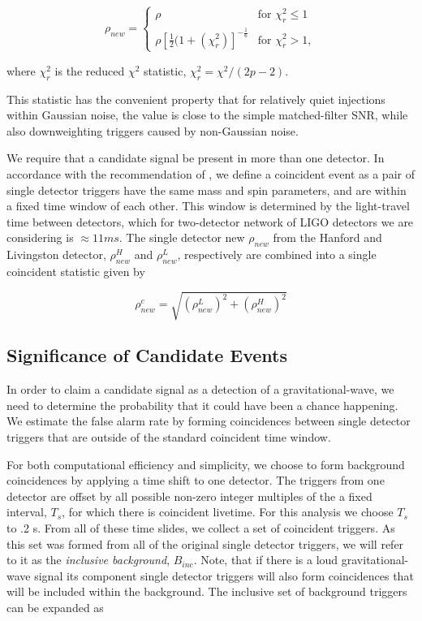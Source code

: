 \begin{equation}
\rho_{new} =
  \begin{cases}
    \rho &\textrm{for } \chi^2_r \leq 1\\
    \rho[\frac{1}{2}(1+(\chi^2_r)]^{-\frac{1}{6}} &\textrm{for } \chi^2_r > 1,
  \end{cases}
\label{eq:newSNR}
\end{equation}

where $\chi^2_r$ is the reduced $\chi^2$ statistic, $\chi^2_r=\chi^2 / (2p - 2)$.

This statistic has the convenient property that for relatively quiet injections within Gaussian noise, the value is close to the simple matched-filter SNR, while also downweighting triggers caused by non-Gaussian noise.

We require that a candidate signal be present in more than one detector. In accordance with the recommendation of \cite{samantha}, we define a coincident event as a  pair of single detector triggers have the same mass and spin parameters, and are within a fixed time window of each other. This window is determined by the light-travel time between detectors, which for two-detector network of LIGO detectors we are considering is $\approx 11 ms$. The single detector new $\rho_{new}$ from the Hanford and Livingston detector, $\rho^H_{new}$ and $\rho^L_{new}$, respectively are combined into a single coincident statistic given by

\begin{equation}
\rho^c_{new} = \sqrt{(\rho^L_{new})^2 + (\rho^H_{new})^2}
\end{equation}

\subsection{Significance of Candidate Events}

In order to claim a candidate signal as a detection of a gravitational-wave, we need to determine the probability that it could have been a chance happening. We estimate the false alarm rate by forming coincidences between single detector triggers that are outside of the standard coincident time window. 

For both computational efficiency and simplicity, we choose to form background coincidences by applying a time shift to one detector. The triggers from one detector are offset by all possible non-zero integer multiples of the a fixed interval, $T_s$, for which there is coincident livetime. For this analysis we choose $T_s$ to .2 s. From all of these time slides, we collect a set of coincident triggers. As this set was formed from all of the original single detector triggers, we will refer to it as the \textit{inclusive background}, $B_{inc}$. Note, that if there is a loud gravitational-wave signal its component single detector triggers will also form coincidences that will be included within the background. The inclusive set of background triggers can be expanded as


